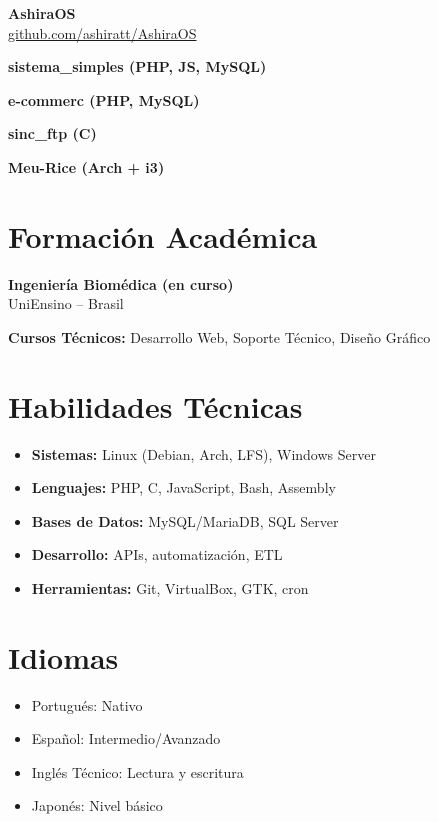 \documentclass[11pt,a4paper]{article}
\begin{document}
\textbf{AshiraOS}\\
\href{https://github.com/ashiratt/AshiraOS}{github.com/ashiratt/AshiraOS}

\textbf{sistema\_simples (PHP, JS, MySQL)}

\textbf{e-commerc (PHP, MySQL)}

\textbf{sinc\_ftp (C)}

\textbf{Meu-Rice (Arch + i3)}

\section{Formación Académica}

\textbf{Ingeniería Biomédica (en curso)}\\
UniEnsino -- Brasil

\textbf{Cursos Técnicos:}
Desarrollo Web, Soporte Técnico, Diseño Gráfico

\section{Habilidades Técnicas}

\begin{itemize}
    \item \textbf{Sistemas:} Linux (Debian, Arch, LFS), Windows Server
    \item \textbf{Lenguajes:} PHP, C, JavaScript, Bash, Assembly
    \item \textbf{Bases de Datos:} MySQL/MariaDB, SQL Server
    \item \textbf{Desarrollo:} APIs, automatización, ETL
    \item \textbf{Herramientas:} Git, VirtualBox, GTK, cron
\end{itemize}

\section{Idiomas}

\begin{itemize}
    \item Portugués: Nativo
    \item Español: Intermedio/Avanzado
    \item Inglés Técnico: Lectura y escritura
    \item Japonés: Nivel básico
\end{itemize}
\end{document}
